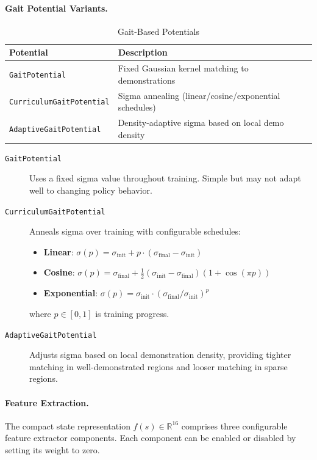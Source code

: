 \documentclass[11pt]{article}
\begin{document}
\paragraph{Gait Potential Variants.}

\begin{table}[H]
\centering
\caption{Gait-Based Potentials}
\begin{tabular}{@{}ll@{}}
\toprule
\textbf{Potential} & \textbf{Description} \\
\midrule
\texttt{GaitPotential} & Fixed Gaussian kernel matching to demonstrations \\
\texttt{CurriculumGaitPotential} & Sigma annealing (linear/cosine/exponential schedules) \\
\texttt{AdaptiveGaitPotential} & Density-adaptive sigma based on local demo density \\
\bottomrule
\end{tabular}
\end{table}

\begin{description}
    \item[\texttt{GaitPotential}] Uses a fixed sigma value throughout training. Simple but may not adapt well to changing policy behavior.

    \item[\texttt{CurriculumGaitPotential}] Anneals sigma over training with configurable schedules:
    \begin{itemize}
        \item \textbf{Linear}: $\sigma(p) = \sigma_{\text{init}} + p \cdot (\sigma_{\text{final}} - \sigma_{\text{init}})$
        \item \textbf{Cosine}: $\sigma(p) = \sigma_{\text{final}} + \frac{1}{2}(\sigma_{\text{init}} - \sigma_{\text{final}})(1 + \cos(\pi p))$
        \item \textbf{Exponential}: $\sigma(p) = \sigma_{\text{init}} \cdot (\sigma_{\text{final}}/\sigma_{\text{init}})^p$
    \end{itemize}
    where $p \in [0, 1]$ is training progress.

    \item[\texttt{AdaptiveGaitPotential}] Adjusts sigma based on local demonstration density, providing tighter matching in well-demonstrated regions and looser matching in sparse regions.
\end{description}

\paragraph{Feature Extraction.}
The compact state representation $f(s) \in \mathbb{R}^{16}$ comprises three configurable feature extractor components. Each component can be enabled or disabled by setting its weight to zero.
\end{document}

